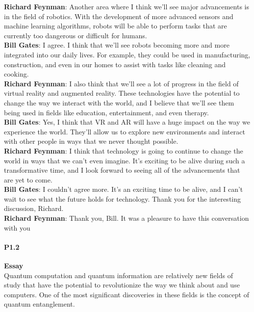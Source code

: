 \textbf{Richard Feynman}: Another area where I think we'll see major advancements is in the field of robotics. With the development of more advanced sensors and machine learning algorithms, robots will be able to perform tasks that are currently too dangerous or difficult for humans.\\

\textbf{Bill Gates}: I agree. I think that we'll see robots becoming more and more integrated into our daily lives. For example, they could be used in manufacturing, construction, and even in our homes to assist with tasks like cleaning and cooking.\\

\textbf{Richard Feynman}: I also think that we'll see a lot of progress in the field of virtual reality and augmented reality. These technologies have the potential to change the way we interact with the world, and I believe that we'll see them being used in fields like education, entertainment, and even therapy.\\

\textbf{Bill Gates}: Yes, I think that VR and AR will have a huge impact on the way we experience the world. They'll allow us to explore new environments and interact with other people in ways that we never thought possible.\\

\textbf{Richard Feynman}: I think that technology is going to continue to change the world in ways that we can't even imagine. It's exciting to be alive during such a transformative time, and I look forward to seeing all of the advancements that are yet to come.\\

\textbf{Bill Gates}: I couldn't agree more. It's an exciting time to be alive, and I can't wait to see what the future holds for technology. Thank you for the interesting discussion, Richard.\\

\textbf{Richard Feynman}: Thank you, Bill. It was a pleasure to have this conversation with you



\paragraph{P1.2} \textbf{Essay}
\\

Quantum computation and quantum information are relatively new fields of study that have the potential to revolutionize the way we think about and use computers. One of the most significant discoveries in these fields is the concept of quantum entanglement.

